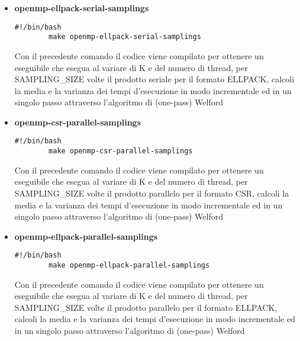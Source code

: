 \documentclass{article}
\begin{document}
\begin{itemize}
\begin{itemize}
        \item \textbf{openmp-ellpack-serial-samplings}
        \begin{lstlisting}[style=bashstyle]
        #!/bin/bash
        make openmp-ellpack-serial-samplings
        \end{lstlisting} Con il precedente comando il codice viene compilato per ottenere un eseguibile che esegua al variare di K e del numero di thread, per SAMPLING\_SIZE volte il prodotto seriale per il formato ELLPACK, calcoli la media e la varianza dei tempi d'esecuzione in modo incrementale ed in un singolo passo attraverso l'algoritmo di (one-pass) Welford
        \item \textbf{openmp-csr-parallel-samplings}
        \begin{lstlisting}[style=bashstyle]
        #!/bin/bash
        make openmp-csr-parallel-samplings
        \end{lstlisting} Con il precedente comando il codice viene compilato per ottenere un eseguibile che esegua al variare di K e del numero di thread, per SAMPLING\_SIZE volte il prodotto parallelo per il formato CSR, calcoli la media e la varianza dei tempi d'esecuzione in modo incrementale ed in un singolo passo attraverso l'algoritmo di (one-pass) Welford
        \item \textbf{openmp-ellpack-parallel-samplings}
        \begin{lstlisting}[style=bashstyle]
        #!/bin/bash
        make openmp-ellpack-parallel-samplings
        \end{lstlisting} Con il precedente comando il codice viene compilato per ottenere un eseguibile che esegua al variare di K e del numero di thread, per SAMPLING\_SIZE volte il prodotto parallelo per il formato ELLPACK, calcoli la media e la varianza dei tempi d'esecuzione in modo incrementale ed in un singolo passo attraverso l'algoritmo di (one-pass) Welford
    \end{itemize}
    

\end{itemize}
\end{document}
